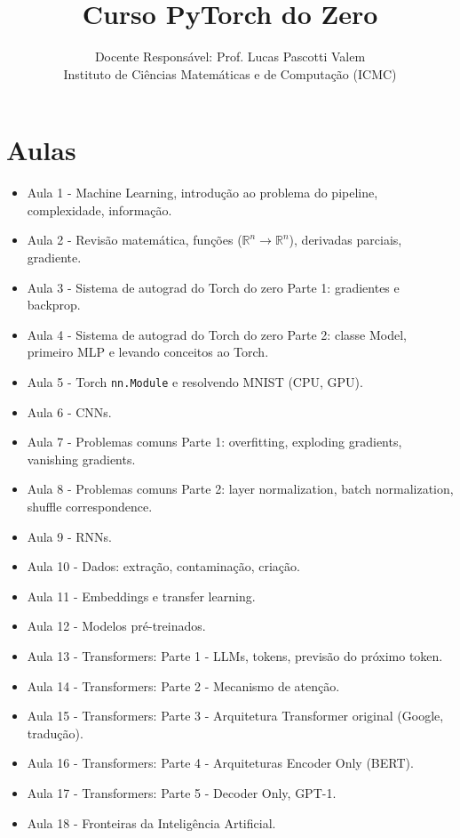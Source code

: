 \documentclass[a4paper,12pt]{article}
\title{Curso PyTorch do Zero}
\author{Docente Responsável: Prof. Lucas Pascotti Valem\\
Instituto de Ciências Matemáticas e de Computação (ICMC)}
\date{}
\begin{document}
\maketitle

\section*{Aulas}
\begin{itemize}
    \item Aula 1 - Machine Learning, introdução ao problema do pipeline, complexidade, informação.

    \item Aula 2 - Revisão matemática, funções (\( \mathbb{R}^n \to \mathbb{R}^n \)), derivadas parciais, gradiente.

    \item Aula 3 - Sistema de autograd do Torch do zero Parte 1: gradientes e backprop.

    \item Aula 4 - Sistema de autograd do Torch do zero Parte 2: classe Model, primeiro MLP e levando conceitos ao Torch.

    \item Aula 5 - Torch \texttt{nn.Module} e resolvendo MNIST (CPU, GPU).

    \item Aula 6 - CNNs.

    \item Aula 7 - Problemas comuns Parte 1: overfitting, exploding gradients, vanishing gradients.

    \item Aula 8 - Problemas comuns Parte 2: layer normalization, batch normalization, shuffle correspondence.

    \item Aula 9 - RNNs.

    \item Aula 10 - Dados: extração, contaminação, criação.

    \item Aula 11 - Embeddings e transfer learning.

    \item Aula 12 - Modelos pré-treinados.

    \item Aula 13 - Transformers: Parte 1 - LLMs, tokens, previsão do próximo token.

    \item Aula 14 - Transformers: Parte 2 - Mecanismo de atenção.

    \item Aula 15 - Transformers: Parte 3 - Arquitetura Transformer original (Google, tradução).

    \item Aula 16 - Transformers: Parte 4 - Arquiteturas Encoder Only (BERT).

    \item Aula 17 - Transformers: Parte 5 - Decoder Only, GPT-1.

    \item Aula 18 - Fronteiras da Inteligência Artificial.
\end{itemize}
\end{document}
